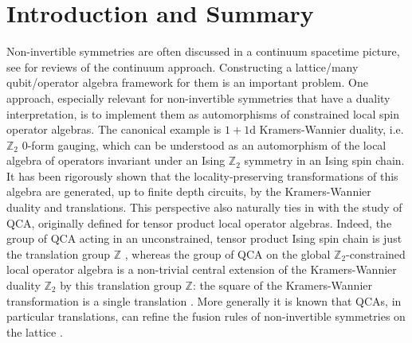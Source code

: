\documentclass[aps,twocolumn,prx,floatfix,preprintnumbers, nofootinbib,10pt]{revtex4-2}
\numberwithin{equation}{section}
\theoremstyle{definition}
\theoremstyle{remark}
\theoremstyle{claim}
\newcommand{\Z}{{\mathbb Z}}
\begin{document}

\maketitle
\tableofcontents


\section{Introduction and Summary}
\label{sec:Intro}


Non-invertible  symmetries are often discussed in a continuum spacetime picture, see \cite{Schafer-Nameki:2023jdn, Bhardwaj:2023kri, Shao:2023gho, Luo:2023ive} for reviews of the continuum approach. Constructing a lattice/many qubit/operator algebra framework for them is an important problem.  One approach, especially relevant for non-invertible symmetries that have a duality interpretation, is to implement them as automorphisms of constrained local spin operator algebras.  The canonical example is $1+1$d Kramers-Wannier duality, i.e. $\Z_2$ $0$-form gauging, which can be understood as an automorphism of the local algebra of operators invariant under an Ising $\Z_2$ symmetry in an Ising spin chain.  It has been rigorously shown \cite{Jones2024DHR, Ma2026quantumcellular, Jones2026QCA} that the locality-preserving transformations of this algebra are generated, up to finite depth circuits, by the Kramers-Wannier duality and translations.  This perspective also naturally ties in with the study of QCA, originally defined for tensor product local operator algebras.  Indeed, the group of QCA acting in an unconstrained, tensor product Ising spin chain is just the translation group $\Z$ \cite{GrossNesmeVogtsWerner2012}, whereas the group of QCA on the global $\Z_2$-constrained local operator algebra is a non-trivial central extension of the Kramers-Wannier duality $\Z_2$ by this translation group $\Z$: the square of the Kramers-Wannier transformation is a single translation \cite{Seiberg:2023cdc, Seiberg:2024gek}. More generally it is known that QCAs, in particular translations, can refine the fusion rules of non-invertible symmetries on the lattice \cite{Zhang:2020pco, Seiberg:2023cdc, Seiberg:2024gek, Seifnashri:2024dsd, Evans:2025msy, Lu:2026rhb, Inamura:2026hif, Jones:2026dcb, Wen:2026ncw}. 
\end{document}
